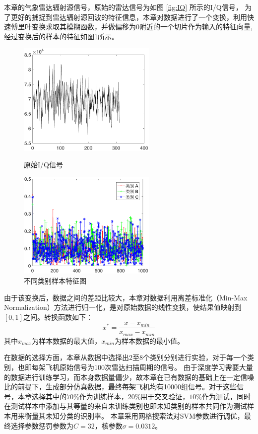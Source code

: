 本章的气象雷达辐射源信号，原始的雷达信号为如图 \ref{fig:IQ} 所示的I/Q信号，
为了更好的捕捉到雷达辐射源回波的特征信息，本章对数据进行了一个变换，利用快速傅里叶变换求取其模糊函数，并做偏移为0附近的一个切片作为输入的特征向量,经过变换后的样本的特征如图\ref{fig:diff_data}所示。
\begin{figure}[hbt]
	\centering
	\begin{minipage}{7cm}
		\centering
		\includegraphics[width=6.67cm]{figures/emitter/IQA}
		\caption{原始I/Q信号}
		\label{fig:IQ}
	\end{minipage}
	\hspace{10pt}
	\begin{minipage}{7cm}
		\centering
		\includegraphics[width=6.67cm]{figures/emitter/diff_data}
		\caption{不同类别样本特征图}
		\label{fig:diff_data}
	\end{minipage}
\end{figure}
由于该变换后，数据之间的差距比较大，本章对数据利用离差标准化（Min-Max Normalization）方法进行归一化，是对原始数据的线性变换，使结果值映射到$[0 , 1]$之间。转换函数如下：
\begin{equation}
x^{*}=\frac{x-x_{min}}{x_{max}-x_{min}}
\end{equation}
其中$x_{max}$为样本数据的最大值，$x_{min}$为样本数据的最小值。

在数据的选择方面，本章从数据中选择出2至8个类别分别进行实验，对于每一个类别，也即每架飞机原始信号为100次雷达扫描周期的信号。
由于深度学习需要大量的数据进行训练学习，而本身数据量偏少，故本章在已有数据的基础上在一定信噪比的前提下，生成部分仿真数据，最终每架飞机均有10000组信号。对于这些信号，本章选择其中的$70\%$作为训练样本，$20\%$用于交叉验证，$10\%$作为测试，同时在测试样本中添加与其等量的来自未训练类别也即未知类别的样本共同作为测试样本用来衡量其未知分类的识别率。
本章采用网格搜索法对SVM参数进行调优，最终选择参数惩罚参数为$C=32$，核参数$\sigma=0.0312$。

